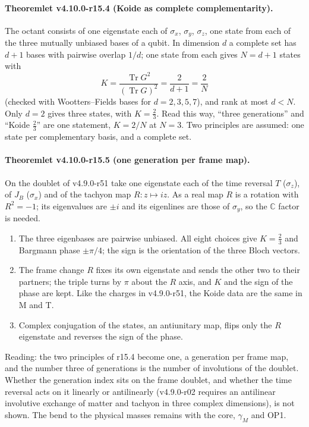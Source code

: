 \paragraph{Theoremlet v4.10.0-r15.4 (Koide as complete complementarity).}
The octant consists of one eigenstate each of \(\sigma_x\), \(\sigma_y\), \(\sigma_z\), one state from each of the three mutually
unbiased bases of a qubit.  In dimension \(d\) a complete set has \(d+1\) bases with pairwise overlap \(1/d\); one state from each
gives \(N=d+1\) states with
\[
K=\frac{\operatorname{Tr}G^2}{(\operatorname{Tr}G)^2}=\frac2{d+1}=\frac2N
\]
(checked with Wootters--Fields bases for \(d=2,3,5,7\)), and rank at most \(d<N\).  Only \(d=2\) gives three states, with
\(K=\tfrac23\).  Read this way, ``three generations'' and ``Koide \(\tfrac23\)'' are one statement, \(K=2/N\) at \(N=3\).  Two principles
are assumed: one state per complementary basis, and a complete set.

\paragraph{Theoremlet v4.10.0-r15.5 (one generation per frame map).}
On the doublet of v4.9.0-r51 take one eigenstate each of the time reversal \(T\) (\(\sigma_z\)), of \(J_B\) (\(\sigma_x\)) and of the
tachyon map \(R\colon z\mapsto iz\).  As a real map \(R\) is a rotation with \(R^2=-1\); its eigenvalues are \(\pm i\) and its eigenlines
are those of \(\sigma_y\), so the \(\mathbb C\) factor is needed.
\begin{enumerate}[leftmargin=2em]
\item[(a)] The three eigenbases are pairwise unbiased.  All eight choices give \(K=\tfrac23\) and Bargmann phase \(\pm\pi/4\); the sign
is the orientation of the three Bloch vectors.
\item[(b)] The frame change \(R\) fixes its own eigenstate and sends the other two to their partners; the triple turns by \(\pi\) about
the \(R\) axis, and \(K\) and the sign of the phase are kept.  Like the charges in v4.9.0-r51, the Koide data are the same in M and T.
\item[(c)] Complex conjugation of the states, an antiunitary map, flips only the \(R\) eigenstate and reverses the sign of the phase.
\end{enumerate}
Reading: the two principles of r15.4 become one, a generation per frame map, and the number three of generations is the
number of involutions of the doublet.  Whether the generation index sits on the frame doublet, and whether the time reversal
acts on it linearly or antilinearly (v4.9.0-r02 requires an antilinear involutive exchange of matter and tachyon in three
complex dimensions), is not shown.  The bend to the physical masses remains with the core, \(\gamma_M\) and OP1.

